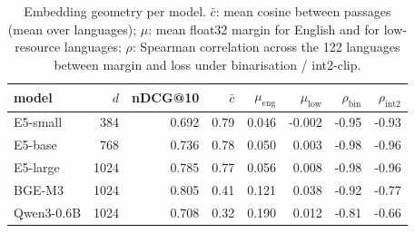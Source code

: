 \begin{table}[t]\centering\footnotesize
\begin{tabular}{lrrrrrrr}
\toprule
model & $d$ & nDCG@10 & $\bar{c}$ & $\mu_{\mathrm{eng}}$ & $\mu_{\mathrm{low}}$ & $\rho_{\mathrm{bin}}$ & $\rho_{\mathrm{int2}}$ \\
\midrule
E5-small & 384 & 0.692 & 0.79 & 0.046 & -0.002 & -0.95 & -0.93 \\
E5-base & 768 & 0.736 & 0.78 & 0.050 & 0.003 & -0.98 & -0.96 \\
E5-large & 1024 & 0.785 & 0.77 & 0.056 & 0.008 & -0.98 & -0.96 \\
BGE-M3 & 1024 & 0.805 & 0.41 & 0.121 & 0.038 & -0.92 & -0.77 \\
Qwen3-0.6B & 1024 & 0.708 & 0.32 & 0.190 & 0.012 & -0.81 & -0.66 \\
\bottomrule
\end{tabular}
\caption{Embedding geometry per model. $\bar{c}$: mean cosine between passages (mean over languages); $\mu$: mean float32 margin for English and for low-resource languages; $\rho$: Spearman correlation across the 122 languages between margin and loss under binarisation / int2-clip.}\label{tab:geom}
\end{table}